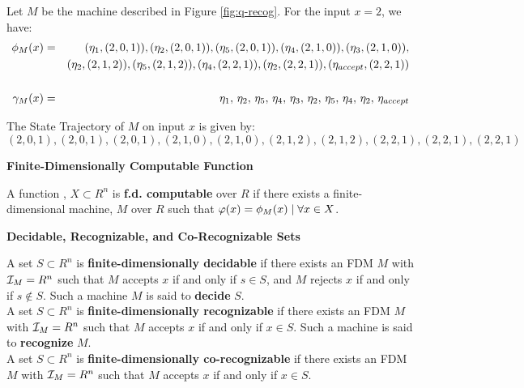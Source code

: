 \begin{example}
  Let $M$ be the machine described in Figure \ref{fig:q-recog}. For
  the input $x = 2$, we have:
  \begin{eqnarray*}
    \phi_M(x) &=& (\eta_1, (2,0,1)), (\eta_2, (2,0,1)), (\eta_5, (2,0,1)), (\eta_4, (2,1,0)), (\eta_3, (2,1,0)),\\
    &&  (\eta_2, (2,1,2)), (\eta_5, (2,1,2)), (\eta_4, (2,2,1)), (\eta_2, (2,2,1)), (\eta_{accept}, (2,2,1))\\
    && \\
    \gamma_M(x) &=& \eta_1,\, \eta_2,\, \eta_5,\, \eta_4,\, \eta_3,\, \eta_2,\, \eta_5,\, \eta_4,\, \eta_2,\, \eta_{accept}
  \end{eqnarray*}

  The State Trajectory of $M$ on input $x$ is given by:
  $$(2,0,1), (2,0,1), (2,0,1), (2,1,0), (2,1,0), (2,1,2), (2,1,2), (2,2,1), (2,2,1), (2,2,1)$$
\end{example}

\begin{definition}{\textbf{Finite-Dimensionally Computable Function}}
  
  A function , $X \subset R^n$ is
  \textbf{f.d. computable} over $R$ if there exists a
  finite-dimensional machine, $M$ over $R$ such that $\varphi(x) =
  \phi_M(x) \mid \forall x \in X$.
  
\end{definition}

\begin{definition}{\textbf{Decidable, Recognizable, and Co-Recognizable Sets}}
  
  A set $S \subset R^n$ is \textbf{finite-dimensionally decidable} if
  there exists an FDM $M$ with $\mathcal{I}_M = R^n$ such that $M$
  accepts $x$ if and only if $s \in S$, and $M$ rejects $x$ if and
  only if $s \notin S$.  Such a machine $M$ is said to \textbf{decide}
  $S$.\\

  A set $S \subset R^n$ is \textbf{finite-dimensionally recognizable}
  if there exists an FDM $M$ with $\mathcal{I}_M = R^n$ such that $M$
  accepts $x$ if and only if $x \in S$.  Such a machine is said to
  \textbf{recognize} $M$.\\

  A set $S \subset R^n$ is \textbf{finite-dimensionally
    co-recognizable} if there exists an FDM $M$ with $\mathcal{I}_M =
  R^n$ such that $M$ accepts $x$ if and only if $x \in S$.
\end{definition}
  
